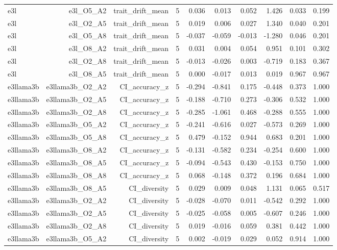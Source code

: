 \documentclass[11pt]{article}
\begin{document}
\begin{landscape}
\begin{longtable}{@{}lrrrrrrrrr@{}}
e3l & e3l\_O5\_A2 & trait\_drift\_mean & 5 & 0.036 & 0.013 & 0.052 & 1.426 & 0.033 & 0.199 \\
e3l & e3l\_O2\_A5 & trait\_drift\_mean & 5 & 0.019 & 0.006 & 0.027 & 1.340 & 0.040 & 0.201 \\
e3l & e3l\_O5\_A8 & trait\_drift\_mean & 5 & -0.037 & -0.059 & -0.013 & -1.280 & 0.046 & 0.201 \\
e3l & e3l\_O8\_A2 & trait\_drift\_mean & 5 & 0.031 & 0.004 & 0.054 & 0.951 & 0.101 & 0.302 \\
e3l & e3l\_O2\_A8 & trait\_drift\_mean & 5 & -0.013 & -0.026 & 0.003 & -0.719 & 0.183 & 0.367 \\
e3l & e3l\_O8\_A5 & trait\_drift\_mean & 5 & 0.000 & -0.017 & 0.013 & 0.019 & 0.967 & 0.967 \\
e3llama3b & e3llama3b\_O2\_A2 & CI\_accuracy\_z & 5 & -0.294 & -0.841 & 0.175 & -0.448 & 0.373 & 1.000 \\
e3llama3b & e3llama3b\_O2\_A5 & CI\_accuracy\_z & 5 & -0.188 & -0.710 & 0.273 & -0.306 & 0.532 & 1.000 \\
e3llama3b & e3llama3b\_O2\_A8 & CI\_accuracy\_z & 5 & -0.285 & -1.061 & 0.468 & -0.288 & 0.555 & 1.000 \\
e3llama3b & e3llama3b\_O5\_A2 & CI\_accuracy\_z & 5 & -0.241 & -0.616 & 0.027 & -0.573 & 0.269 & 1.000 \\
e3llama3b & e3llama3b\_O5\_A8 & CI\_accuracy\_z & 5 & 0.479 & -0.152 & 0.944 & 0.683 & 0.201 & 1.000 \\
e3llama3b & e3llama3b\_O8\_A2 & CI\_accuracy\_z & 5 & -0.131 & -0.582 & 0.234 & -0.254 & 0.600 & 1.000 \\
e3llama3b & e3llama3b\_O8\_A5 & CI\_accuracy\_z & 5 & -0.094 & -0.543 & 0.430 & -0.153 & 0.750 & 1.000 \\
e3llama3b & e3llama3b\_O8\_A8 & CI\_accuracy\_z & 5 & 0.068 & -0.148 & 0.372 & 0.196 & 0.684 & 1.000 \\
e3llama3b & e3llama3b\_O8\_A5 & CI\_diversity & 5 & 0.029 & 0.009 & 0.048 & 1.131 & 0.065 & 0.517 \\
e3llama3b & e3llama3b\_O2\_A2 & CI\_diversity & 5 & -0.028 & -0.070 & 0.011 & -0.542 & 0.292 & 1.000 \\
e3llama3b & e3llama3b\_O2\_A5 & CI\_diversity & 5 & -0.025 & -0.058 & 0.005 & -0.607 & 0.246 & 1.000 \\
e3llama3b & e3llama3b\_O2\_A8 & CI\_diversity & 5 & 0.019 & -0.016 & 0.059 & 0.381 & 0.442 & 1.000 \\
e3llama3b & e3llama3b\_O5\_A2 & CI\_diversity & 5 & 0.002 & -0.019 & 0.029 & 0.052 & 0.914 & 1.000 \\

\end{longtable}
\end{landscape}
\end{document}
